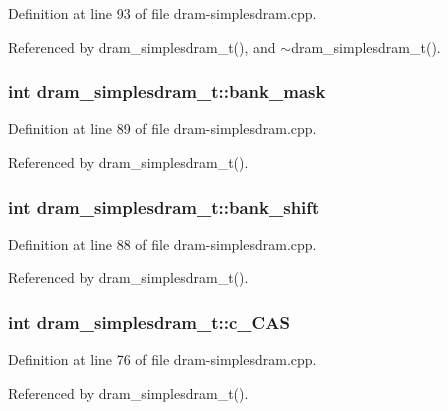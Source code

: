Definition at line 93 of file dram-simplesdram.cpp.

Referenced by dram\_\-simplesdram\_\-t(), and $\sim$dram\_\-simplesdram\_\-t().
\subsubsection[{bank\_\-mask}]{\setlength{\rightskip}{0pt plus 5cm}int {\bf dram\_\-simplesdram\_\-t::bank\_\-mask}\hspace{0.3cm}{\tt  [protected]}}\label{classdram__simplesdram__t_13f2693dc58e52765df98233fd06f30d}




Definition at line 89 of file dram-simplesdram.cpp.

Referenced by dram\_\-simplesdram\_\-t().
\subsubsection[{bank\_\-shift}]{\setlength{\rightskip}{0pt plus 5cm}int {\bf dram\_\-simplesdram\_\-t::bank\_\-shift}\hspace{0.3cm}{\tt  [protected]}}\label{classdram__simplesdram__t_8358a46b5bad7e0637d20a8cbf0a00eb}




Definition at line 88 of file dram-simplesdram.cpp.

Referenced by dram\_\-simplesdram\_\-t().
\subsubsection[{c\_\-CAS}]{\setlength{\rightskip}{0pt plus 5cm}int {\bf dram\_\-simplesdram\_\-t::c\_\-CAS}\hspace{0.3cm}{\tt  [protected]}}\label{classdram__simplesdram__t_a232228f2c46cd07cafcbe3fe633dffa}




Definition at line 76 of file dram-simplesdram.cpp.

Referenced by dram\_\-simplesdram\_\-t().
